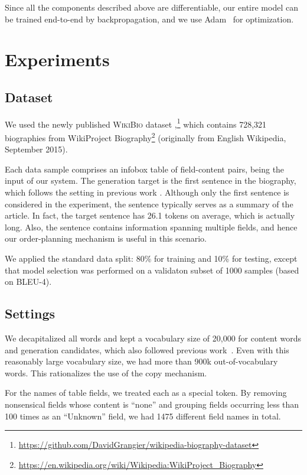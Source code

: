 \documentclass[letterpaper]{article} %
\begin{document}
Since all the components described above are differentiable, our entire model can be trained end-to-end by backpropagation, and we use Adam~\cite{adam} for optimization.
\section{Experiments}

\subsection{Dataset}


We used the newly published \textsc{WikiBio} dataset \cite{wikibio},\footnote{\url{https://github.com/DavidGrangier/wikipedia-biography-dataset}} which contains 728,321 biographies from WikiProject Biography\footnote{\url{https://en.wikipedia.org/wiki/Wikipedia:WikiProject_Biography}} (originally from English Wikipedia, September 2015).


Each data sample comprises an infobox table of field-content pairs, being the input of our system. The generation target is the first sentence in the biography, which follows the setting in previous work \cite{wikibio}. Although only the first sentence is considered in the experiment, the sentence typically serves as a summary of the article. In fact, the target sentence has 26.1 tokens on average, which is actually long. Also, the sentence contains information spanning multiple fields, and hence our order-planning mechanism is useful in this scenario.

We applied the standard data split: 80\% for training and 10\% for testing, except that model selection was performed on a validaton subset of 1000 samples (based on BLEU-4).

\subsection{Settings}

We decapitalized all words and kept a vocabulary size of 20,000 for content words and generation candidates, which also followed previous work~\cite{wikibio}. Even with this reasonably large vocabulary size, we had more than 900k out-of-vocabulary words. This rationalizes the use of the copy mechanism.

For the names of table fields, we treated each as a special token. By removing nonsensical fields whose content is ``none'' and grouping fields occurring less than 100 times as an ``Unknown'' field, we had 1475 different field names in total.
\end{document}

